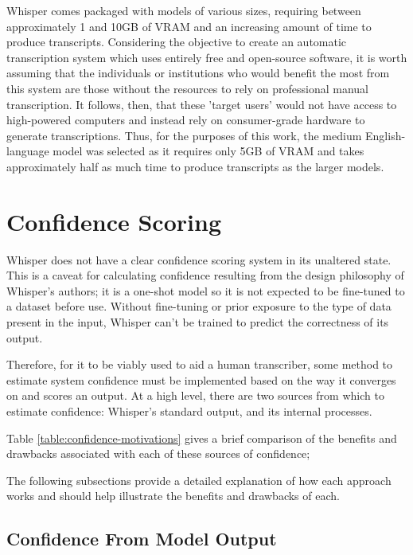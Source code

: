 Whisper comes packaged with models of various sizes, requiring between approximately 1 and 10GB of VRAM and an increasing amount of time to produce transcripts.
Considering the objective to create an automatic transcription system which uses entirely free and open-source software, it is worth assuming that the individuals or institutions who would benefit the most from this system are those without the resources to rely on professional manual transcription.
It follows, then, that these 'target users' would not have access to high-powered computers and instead rely on consumer-grade hardware to generate transcriptions.
Thus, for the purposes of this work, the medium English-language model was selected as it requires only 5GB of VRAM and takes approximately half as much time to produce transcripts as the larger models\cite{whisper}.

\section{Confidence Scoring}\label{sec:confidence-scoring}

Whisper does not have a clear confidence scoring system in its unaltered state.
This is a caveat for calculating confidence resulting from the design philosophy of Whisper's authors; it is a one-shot model so it is not expected to be fine-tuned to a dataset before use.
Without fine-tuning or prior exposure to the type of data present in the input, Whisper can't be trained to predict the correctness of its output.

Therefore, for it to be viably used to aid a human transcriber, some method to estimate system confidence must be implemented based on the way it converges on and scores an output.
At a high level, there are two sources from which to estimate confidence: Whisper's standard output, and its internal processes.

Table \ref{table:confidence-motivations} gives a brief comparison of the benefits and drawbacks associated with each of these sources of confidence;



The following subsections provide a detailed explanation of how each approach works and should help illustrate the benefits and drawbacks of each.

\subsection{Confidence From Model Output}

